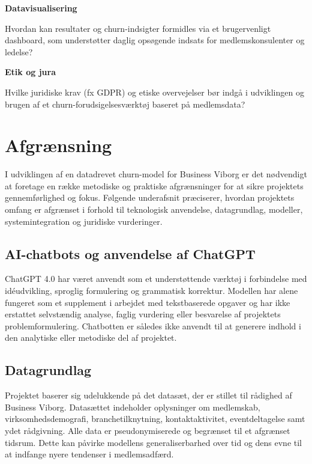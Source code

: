 \documentclass[
  11pt,
  letterpaper,
  DIV=11,
  numbers=noendperiod]{scrartcl}
\begin{document}
\textbf{Datavisualisering}

Hvordan kan resultater og churn-indsigter formidles via et brugervenligt
dashboard, som understøtter daglig opsøgende indsats for
medlemskonsulenter og ledelse?

\textbf{Etik og jura}

Hvilke juridiske krav (fx GDPR) og etiske overvejelser bør indgå i
udviklingen og brugen af et churn-forudsigelsesværktøj baseret på
medlemsdata?

\section{Afgrænsning}\label{afgruxe6nsning}

I udviklingen af en datadrevet churn-model for Business Viborg er det
nødvendigt at foretage en række metodiske og praktiske afgrænsninger for
at sikre projektets gennemførlighed og fokus. Følgende underafsnit
præciserer, hvordan projektets omfang er afgrænset i forhold til
teknologisk anvendelse, datagrundlag, modeller, systemintegration og
juridiske vurderinger.

\subsection{AI-chatbots og anvendelse af
ChatGPT}\label{ai-chatbots-og-anvendelse-af-chatgpt}

ChatGPT 4.0 har været anvendt som et understøttende værktøj i
forbindelse med idéudvikling, sproglig formulering og grammatisk
korrektur. Modellen har alene fungeret som et supplement i arbejdet med
tekstbaserede opgaver og har ikke erstattet selvstændig analyse, faglig
vurdering eller besvarelse af projektets problemformulering. Chatbotten
er således ikke anvendt til at generere indhold i den analytiske eller
metodiske del af projektet.

\subsection{Datagrundlag}\label{datagrundlag}

Projektet baserer sig udelukkende på det datasæt, der er stillet til
rådighed af Business Viborg. Datasættet indeholder oplysninger om
medlemskab, virksomhedsdemografi, branchetilknytning, kontaktaktivitet,
eventdeltagelse samt ydet rådgivning. Alle data er pseudonymiserede og
begrænset til et afgrænset tidsrum. Dette kan påvirke modellens
generaliserbarhed over tid og dens evne til at indfange nyere tendenser
i medlemsadfærd.
\end{document}

